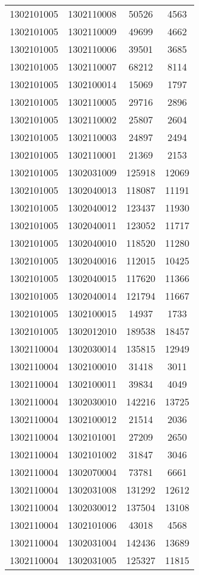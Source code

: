 \begin{longtable}{llcc}
1302101005 & 1302110008 & 50526 & 4563\\
1302101005 & 1302110009 & 49699 & 4662\\
1302101005 & 1302110006 & 39501 & 3685\\
1302101005 & 1302110007 & 68212 & 8114\\
1302101005 & 1302100014 & 15069 & 1797\\
1302101005 & 1302110005 & 29716 & 2896\\
1302101005 & 1302110002 & 25807 & 2604\\
1302101005 & 1302110003 & 24897 & 2494\\
1302101005 & 1302110001 & 21369 & 2153\\
1302101005 & 1302031009 & 125918 & 12069\\
1302101005 & 1302040013 & 118087 & 11191\\
1302101005 & 1302040012 & 123437 & 11930\\
1302101005 & 1302040011 & 123052 & 11717\\
1302101005 & 1302040010 & 118520 & 11280\\
1302101005 & 1302040016 & 112015 & 10425\\
1302101005 & 1302040015 & 117620 & 11366\\
1302101005 & 1302040014 & 121794 & 11667\\
1302101005 & 1302100015 & 14937 & 1733\\
1302101005 & 1302012010 & 189538 & 18457\\
1302110004 & 1302030014 & 135815 & 12949\\
1302110004 & 1302100010 & 31418 & 3011\\
1302110004 & 1302100011 & 39834 & 4049\\
1302110004 & 1302030010 & 142216 & 13725\\
1302110004 & 1302100012 & 21514 & 2036\\
1302110004 & 1302101001 & 27209 & 2650\\
1302110004 & 1302101002 & 31847 & 3046\\
1302110004 & 1302070004 & 73781 & 6661\\
1302110004 & 1302031008 & 131292 & 12612\\
1302110004 & 1302030012 & 137504 & 13108\\
1302110004 & 1302101006 & 43018 & 4568\\
1302110004 & 1302031004 & 142436 & 13689\\
1302110004 & 1302031005 & 125327 & 11815\\

\end{longtable}

